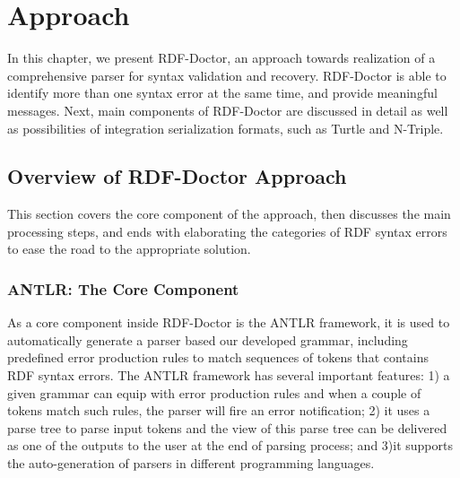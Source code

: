 \chapter{Approach}
\label{ch:approach}
In this chapter, we present RDF-Doctor, an approach towards realization of a comprehensive parser for syntax validation and recovery.
RDF-Doctor is able to identify more than one syntax error at the same time, and provide meaningful messages.
Next, main components of RDF-Doctor are discussed in detail as well as possibilities of integration serialization formats, such as Turtle and N-Triple.


\section{Overview of RDF-Doctor Approach}

This section covers the core component of the approach, then discusses the main processing steps, and ends with elaborating the categories of RDF syntax errors to ease the road to the appropriate solution. 

\subsection{ANTLR: The Core Component}

As a core component inside RDF-Doctor is the ANTLR framework, it is used to automatically generate a parser based our developed grammar, including predefined error production rules to match sequences of tokens that contains RDF syntax errors.
The ANTLR framework has several important features: 1) a given grammar can equip with error production rules and when a couple of tokens match such rules, the parser will fire an error notification; 2) it uses a parse tree to parse input tokens and the view of this parse tree can be delivered as one of the outputs to the user at the end of parsing process; and 3)it supports the auto-generation of parsers in different programming languages.

